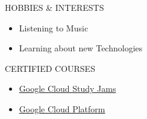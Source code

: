 \documentclass{resume}
\begin{document}
\begin{rSection}{HOBBIES \& INTERESTS}
\begin{itemize}
    \item Listening to Music
    \vspace{-0.4em}
    \item Learning about new Technologies
\end{itemize}
\end{rSection}
\vspace{-0.4em}

\begin{rSection}{CERTIFIED COURSES}
\begin{itemize}
    \item \href{https://www.cloudskillsboost.google/public_profiles/dcbf7583-1c68-4d5c-a408-9ad45d93130d}{Google Cloud Study Jams}
\end{itemize}
\vspace{-0.4em}
\begin{itemize}
    \item \href{https://www.cloudskillsboost.google/public_profiles/7594501c-7933-4fba-be9b-2a92ca3ee410}{Google Cloud Platform}
\end{itemize}
\end{rSection}
\end{document}
